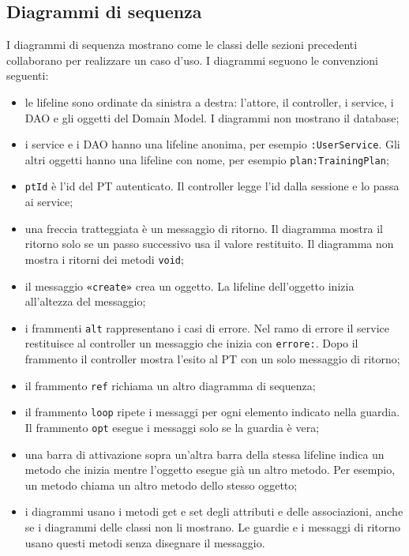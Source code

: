\subsection{Diagrammi di sequenza}
\label{sec:sequenceDiagrams}
I diagrammi di sequenza mostrano come le classi delle sezioni
precedenti collaborano per realizzare un caso d'uso. I diagrammi
seguono le convenzioni seguenti:
\begin{itemize}
  \item le lifeline sono ordinate da sinistra a destra: l'attore, il
    controller, i service, i DAO e gli oggetti del Domain Model. I
    diagrammi non mostrano il database;
  \item i service e i DAO hanno una lifeline anonima, per esempio
    \texttt{:UserService}. Gli altri oggetti hanno una lifeline con
    nome, per esempio \texttt{plan:TrainingPlan};
  \item \texttt{ptId} è l'id del PT autenticato. Il controller legge
    l'id dalla sessione e lo passa ai service;
  \item una freccia tratteggiata è un messaggio di ritorno. Il
    diagramma mostra il ritorno solo se un passo successivo usa il
    valore restituito. Il diagramma non mostra i ritorni dei metodi
    \texttt{void};
  \item il messaggio {\selectfont\texttt{«create»}}
    crea un oggetto. La lifeline
    dell'oggetto inizia all'altezza del messaggio;
  \item i frammenti \texttt{alt} rappresentano i casi di errore. Nel
    ramo di errore il service restituisce al controller un messaggio
    che inizia con \texttt{errore:}. Dopo il frammento il controller mostra l'esito
    al PT con un solo messaggio di ritorno;
  \item il frammento \texttt{ref} richiama un altro diagramma di
    sequenza;
  \item il frammento \texttt{loop} ripete i messaggi per ogni
    elemento indicato nella guardia. Il frammento \texttt{opt} esegue
    i messaggi solo se la guardia è vera;
  \item una barra di attivazione sopra un'altra barra della stessa
    lifeline indica un metodo che inizia mentre l'oggetto esegue già
    un altro metodo. Per esempio, un metodo chiama un altro metodo
    dello stesso oggetto;
  \item i diagrammi usano i metodi get e set degli attributi e delle
    associazioni, anche se i diagrammi delle classi non li mostrano.
    Le guardie e i messaggi di ritorno usano questi metodi senza
    disegnare il messaggio.
\end{itemize}

